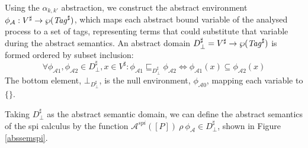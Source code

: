 \documentclass[10pt,a4paper,final,oneside,fleqn]{book}
\begin{document}
Using the $\alpha_{k,k'}$ abstraction, we construct the abstract environment $\phi_\mathcal{A}:V^\sharp\to\wp(\mbox{{\itshape Tag\/}}^\sharp)$, which maps each abstract bound variable of the analysed process to a set of tags, representing terms that could substitute that variable during the abstract semantics.  An abstract domain $D^\sharp_\bot=V^\sharp\to\wp(\mbox{{\itshape Tag\/}}^\sharp)$ is formed ordered by subset inclusion:
\[\forall\phi_{\mathcal{A}1},\phi_{\mathcal{A}2}\in D^\sharp_\bot,x\in V^\sharp: \phi_{\mathcal{A}1}\sqsubseteq_{D^\sharp_\bot}\phi_{\mathcal{A}2}\Leftrightarrow\phi_{\mathcal{A}1}(x)\subseteq\phi_{\mathcal{A}2}(x)\]
The bottom element, $\bot_{D^\sharp_\bot}$, is the null environment, $\phi_{\mathcal{A}0}$, mapping each variable to $\{\}$.

Taking $D^\sharp_\bot$ as the abstract semantic domain, we can define the abstract semantics of the spi calculus by the function $\mathcal{A}^{spi}(\![P]\!)~\rho~\phi_\mathcal{A}\in D^\sharp_\bot$, shown in Figure \ref{abssemspi}.
\end{document}
